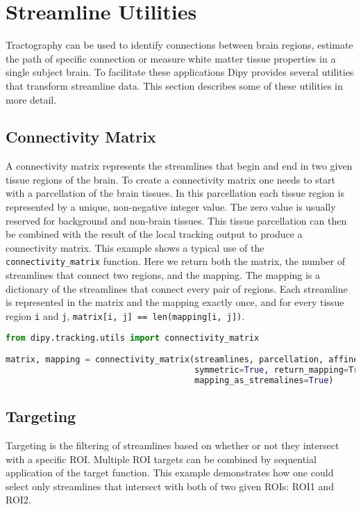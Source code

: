 \section{Streamline Utilities}

Tractography can be used to identify connections between brain regions, estimate the path of specific connection or measure white matter tissue properties in a single subject brain. To facilitate these applications Dipy provides several utilities that transform streamline data. This section describes some of these utilities in more detail.

\subsection{Connectivity Matrix}
A connectivity matrix represents the streamlines that begin and end in two given tissue regions of the brain. To create a connectivity matrix one needs to start with a parcellation of the brain tissues. In this parcellation each tissue region is represented by a unique, non-negative integer value. The zero value is usually reserved for background and non-brain tissues. This tissue parcellation can then be combined with the result of the local tracking output to produce a connectivity matrix. This example shows a typical use of the \verb|connectivity_matrix| function. Here we return both the matrix, the number of streamlines that connect two regions, and the mapping. The mapping is a dictionary of the streamlines that connect every pair of regions. Each streamline is represented in the matrix and the mapping exactly once, and for every tissue region \verb|i| and \verb|j|, \verb|matrix[i, j] == len(mapping[i, j])|.

\begin{lstlisting}[language=python]
from dipy.tracking.utils import connectivity_matrix

matrix, mapping = connectivity_matrix(streamlines, parcellation, affine=affine,
                                      symmetric=True, return_mapping=True,
                                      mapping_as_stremalines=True)
\end{lstlisting}

\subsection{Targeting}
Targeting is the filtering of streamlines based on whether or not they intersect with a specific ROI. Multiple ROI targets can be combined by sequential application of the target function. This example demonstrates how one could select only streamlines that intersect with both of two given ROIs: ROI1 and ROI2.

